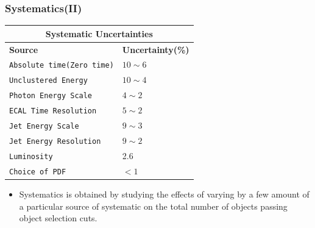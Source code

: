 \documentclass{beamer}
\begin{document}
\begin{frame}
\frametitle{\Huge Systematics(II)}
\begin{minipage}[t]{0.8\textwidth}
\centering
\begin{tabular}{l l}
  \multicolumn{2}{c}{\bfseries{Systematic Uncertainties}} \\
  \hline 
   \bfseries{Source} & \bfseries{Uncertainty(\%)} \\
   \hline
   \texttt{Absolute time(Zero time)}& $10\sim 6$  \\
   \texttt{Unclustered Energy}&  $10 \sim 4 $  \\
   \texttt{Photon Energy Scale}& $ 4 \sim 2$  \\
   \texttt{ECAL Time Resolution}& $ 5 \sim 2 $   \\
   \texttt{Jet Energy Scale}& $9 \sim 3$   \\
   \texttt{Jet Energy Resolution}& $ 9 \sim 2 $  \\
   \hline
   \texttt{Luminosity} & 2.6    \\
   \texttt{Choice of PDF} & $ < 1$ \\
  \hline \hline
 \end{tabular} 
 \end{minipage}
 
 \begin{minipage}[b]{0.8\textwidth}
 \begin{itemize}
  \item Systematics is obtained by studying the effects of varying by a few amount of a particular source of systematic on the total number of objects passing object selection cuts.
   \end{itemize}
 \end{minipage}
\end{frame}

\end{document}
